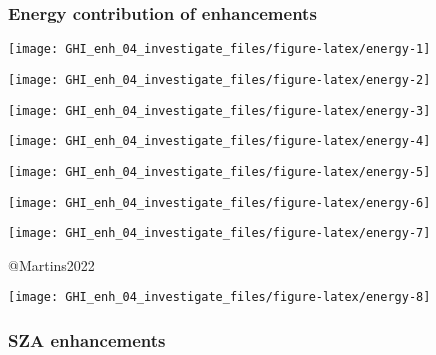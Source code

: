 \documentclass[
  10pt,
  a4paper,oneside]{article}
\begin{document}
\newpage
\FloatBarrier

\hypertarget{energy-contribution-of-enhancements}{%
\subsubsection{Energy contribution of enhancements}\label{energy-contribution-of-enhancements}}

\begin{center}\texttt{[image: GHI\_enh\_04\_investigate\_files/figure-latex/energy-1]} \end{center}

\begin{center}\texttt{[image: GHI\_enh\_04\_investigate\_files/figure-latex/energy-2]} \end{center}

\begin{center}\texttt{[image: GHI\_enh\_04\_investigate\_files/figure-latex/energy-3]} \end{center}

\begin{center}\texttt{[image: GHI\_enh\_04\_investigate\_files/figure-latex/energy-4]} \end{center}

\begin{center}\texttt{[image: GHI\_enh\_04\_investigate\_files/figure-latex/energy-5]} \end{center}

\begin{center}\texttt{[image: GHI\_enh\_04\_investigate\_files/figure-latex/energy-6]} \end{center}

\begin{center}\texttt{[image: GHI\_enh\_04\_investigate\_files/figure-latex/energy-7]} \end{center}

@Martins2022

\begin{center}\texttt{[image: GHI\_enh\_04\_investigate\_files/figure-latex/energy-8]} \end{center}

\newpage
\FloatBarrier

\hypertarget{sza-enhancements}{%
\subsubsection{SZA enhancements}\label{sza-enhancements}}
\end{document}
